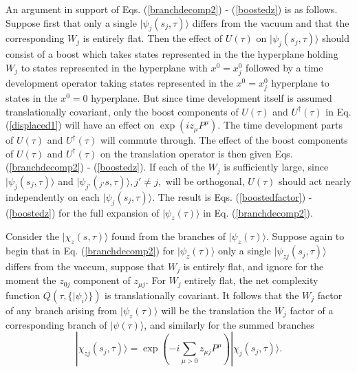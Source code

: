 \documentclass[12pt,amsmath,amssymb,onecolumn]{revtex4-2}
\begin{document}
An argument in support of Eqs. (\ref{branchdecomp2}) - (\ref{boostedz}) is as follows.
Suppose first that only a single $|\psi_j(s_j, \tau) \rangle $ differs
from the vacuum and that the corresponding $W_j$ is entirely flat.
Then the effect of $U(\tau)$  on $|\psi_j(s_j, \tau) \rangle $
should consist of a boost which takes states
represented in the 
the hyperplane holding $W_j$ to
states represented in the
hyperplane with $x^0 = x^0_j$ followed by a time development operator
taking states represented in 
the $x^0 = x^0_j$ hyperplane to states in the $x^0 = 0$ hyperplane.
But since time development itself is assumed translationally
covariant, only the boost components of $U( \tau)$ and
$U^\dagger( \tau)$ in Eq. (\ref{displaced1}) will have an effect on
$\exp( i z_\mu P^\mu )$.
 The time development parts of $U( \tau)$ and
$U^\dagger( \tau)$ will commute through.
The effect
of the boost components of $U( \tau)$ and
$U^\dagger( \tau)$ on the
translation operator
is then given Eqs. (\ref{branchdecomp2}) - (\ref{boostedz}).
If each of the $W_j$ is sufficiently large, since
$|\psi_j(s_j, \tau) \rangle $ and $|\psi_{j'}(_{j'}s, \tau) \rangle , j' \ne j,$
will be orthogonal,
$U( \tau)$ should act nearly independently
on each $|\psi_j(s_j, \tau) \rangle $. The result
is Eqs. (\ref{boostedfactor}) - (\ref{boostedz}) for
the full expansion of $|\psi_z(\tau) \rangle $ in Eq. (\ref{branchdecomp2}).

Consider the  $|\chi_z( s, \tau) \rangle $
found from the branches of $|\psi_z( \tau) \rangle $.
Suppose again to begin that in Eq. (\ref{branchdecomp2}) for $|\psi_z( \tau) \rangle $
only a single $|\psi_{zj}( s_j, \tau) \rangle $ differs from the
vaccum, suppose that $W_j$ is entirely flat,
and ignore for the moment the
$z_{0j}$ component of $z_{\mu j}$.
For $W_j$ entirely flat,
the net complexity function $Q( \tau, \{ |\psi_i \rangle  \})$ is
translationally covariant. It follows that
the $W_j$ factor of any
branch arising from $|\psi_z( \tau) \rangle $
will be the translation the $W_j$
factor of a corresponding 
branch of $|\psi( \tau) \rangle $,
and similarly for the summed branches
\begin{equation}
  \label{translatedchi}
   |\chi_{zj}( s_j, \tau) \rangle  = \exp( -i \sum_{ \mu  >  0} z_{\mu j} P^\mu) |\chi_j( s_j, \tau) \rangle .
\end{equation}
\end{document}
